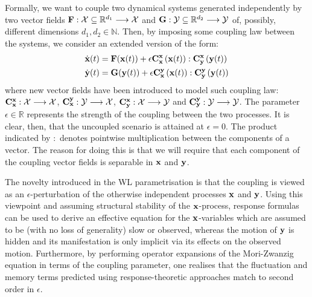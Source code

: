 \documentclass[12pt]{article}
\begin{document}
Formally, we want to couple two dynamical systems generated independently by two vector fields $\mathbf{F} : \mathcal{X}\subseteq \mathbb{R}^{d_1} \longrightarrow \mathcal{X}$ and $\mathbf{G} : \mathcal{Y}\subseteq \mathbb{R}^{d_2}\longrightarrow \mathcal{Y}$ of, possibly, different dimensions $d_1,d_2\in \mathbb{N}$. Then, by imposing some coupling law between the systems, we consider an extended version of the form:
\begin{align}
	\label{mle1}
	\dot{\mathbf{x}}(t) &= \mathbf{F}(\mathbf{x}(t)) + \epsilon \mathbf{C}_{\mathbf{x}}^{\mathbf{x}}\left(\mathbf{x}(t) \right) : \mathbf{C}_{\mathbf{y}}^{\mathbf{x}}\left(\mathbf{y}(t) \right) \\
	\label{mle2}
	\dot{\mathbf{y}}(t) &= \mathbf{G}(\mathbf{y}(t)) + \epsilon \mathbf{C}_{\mathbf{x}}^{\mathbf{y}}\left(\mathbf{x}(t) \right):\mathbf{C}_{\mathbf{y}}^{\mathbf{y}}\left(\mathbf{y}(t) \right)
\end{align}
where new vector fields have been introduced to model such coupling law:
	$\mathbf{C}_{\mathbf{x}}^{\mathbf{x}}:\mathcal{X} \longrightarrow \mathcal{X}$, $\mathbf{C}_{\mathbf{x}}^{\mathbf{y}}: \mathcal{Y} \longrightarrow \mathcal{X}$, $\mathbf{C}_{\mathbf{y}}^{\mathbf{x}}:\mathcal{X} \longrightarrow \mathcal{Y}$ and $\mathbf{C}_{\mathbf{y}}^{\mathbf{y}}:\mathcal{Y} \longrightarrow \mathcal{Y}$. The parameter $\epsilon \in \mathbb{R}$ represents the strength of the coupling between the two processes. It is clear, then, that the uncoupled scenario is attained at $\epsilon = 0$. The product indicated by $:$ denotes pointwise multiplication between the components of a vector. The reason for doing this is that we will require that each component of the coupling vector fields is separable in $\mathbf{x}$ and $\mathbf{y}$. 
	

The novelty introduced in the WL parametrisation is that the coupling is viewed as an $\epsilon$-perturbation of the otherwise independent processes $\mathbf{x}$ and $\mathbf{y}$. Using this viewpoint and assuming structural stability of the $\mathbf{x}$-process, response formulas can be used to derive an effective equation for the $\mathbf{x}$-variables which are assumed to be (with no loss of generality) slow or observed, whereas the motion of $\mathbf{y}$ is hidden and its manifestation is only implicit via its effects on the observed motion. Furthermore, by performing operator expansions of the Mori-Zwanzig equation in terms of the coupling parameter, one realises that the fluctuation and memory terms predicted using response-theoretic approaches match to second order in $\epsilon$.
\end{document}
